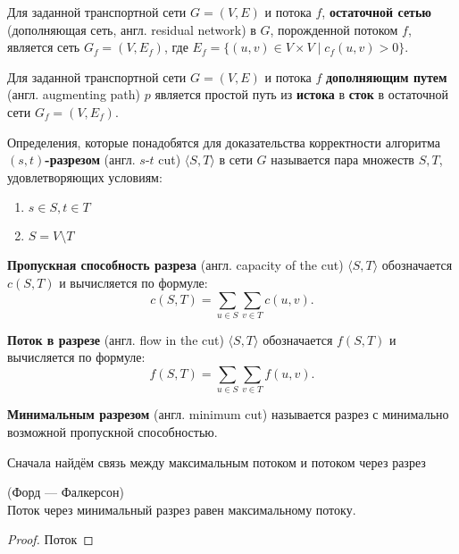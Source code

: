\begin{definition}
	Для заданной транспортной сети $G=(V,E)$ и потока $f$, \textbf{остаточной сетью} (дополняющая сеть, англ. residual network) в $G$, порожденной потоком $f$, является сеть $G_f=(V,E_f)$, где $E_f=\{(u,v) \in V \times V \mid c_f(u,v) > 0\}$.
\end{definition}

\begin{definition}
	Для заданной транспортной сети $G=(V,E)$ и потока $f$ \textbf{дополняющим путем} (англ. augmenting path) $p$ является простой путь из \textbf{истока} в \textbf{сток} в остаточной сети $G_f=(V,E_f)$.
\end{definition}

\begin{definition}
	
Определения, которые понадобятся для доказательства корректности алгоритма
\textbf{$(s,t)$-разрезом} (англ. $s$-$t$ cut) $\langle S,T \rangle$ в сети $G$ называется пара множеств $S, T$, удовлетворяющих условиям:
\begin{enumerate}
	\item $s \in S, t \in T$
	\item $S = V \setminus T$
\end{enumerate}
\end{definition}

\begin{definition}
\textbf{Пропускная способность разреза} (англ. capacity of the cut) $\langle S,T \rangle$ обозначается $c(S,T)$ и вычисляется по формуле:
$$c(S,T) = \sum_{u \in S} \sum_{v \in T} c(u, v).$$
\end{definition}

\begin{definition}
	\textbf{Поток в разрезе }(англ. flow in the cut) $\langle S,T \rangle$ обозначается $f(S,T)$ и вычисляется по формуле:
	$$f(S,T) = \sum_{u \in S} \sum_{v \in T} f(u, v).$$
\end{definition}
 


\begin{definition}
	\textbf{Минимальным разрезом} (англ. minimum cut) называется разрез с минимально возможной пропускной способностью.
	
\end{definition}

Сначала найдём связь между максимальным потоком и потоком через разрез

\begin{theorem}{(Форд --- Фалкерсон)}\\
	Поток через минимальный разрез равен максимальному потоку.
\end{theorem}

\begin{proof}
	Поток	
\end{proof}



